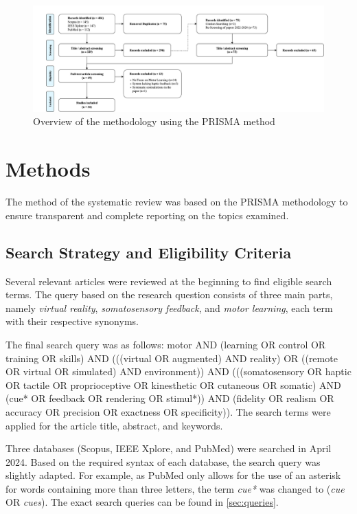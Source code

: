
\begin{figure}[htbp]
    \centering
    \includegraphics[width=\linewidth]{figures/prisma_overview.png} 
    \caption{Overview of the methodology using the PRISMA method}
    \label{fig:prisma}
\end{figure} 

\section{Methods}
\label{sec:methods}

The method of the systematic review was based on the PRISMA methodology \cite{Page2021TheReviews} to ensure transparent and complete reporting on the topics examined.

\subsection{Search Strategy and Eligibility Criteria}
\label{sec:eligibility}
Several relevant articles were reviewed at the beginning to find eligible search terms. The query based on the research question consists of three main parts, namely \textit{virtual reality}, \textit{somatosensory feedback}, and \textit{motor learning}, each term with their respective synonyms. 

The final search query was as follows: motor AND (learning OR control OR training OR skills) AND (((virtual OR augmented) AND reality) OR ((remote OR virtual OR simulated) AND environment)) AND (((somatosensory OR haptic OR tactile OR proprioceptive OR kinesthetic OR cutaneous OR somatic) AND 
(cue* OR feedback OR rendering OR stimul*)) AND (fidelity OR realism OR accuracy OR precision OR exactness OR specificity)). The search terms were applied for the article title, abstract, and keywords.

Three databases (Scopus, IEEE Xplore, and PubMed) were searched in April 2024. Based on the required syntax of each database, the search query was slightly adapted. For example, as PubMed only allows for the use of an asterisk for words containing more than three letters, the term \textit{cue*} was changed to (\textit{cue} OR \textit{cues}). The exact search queries can be found in \ref{sec:queries}. 

